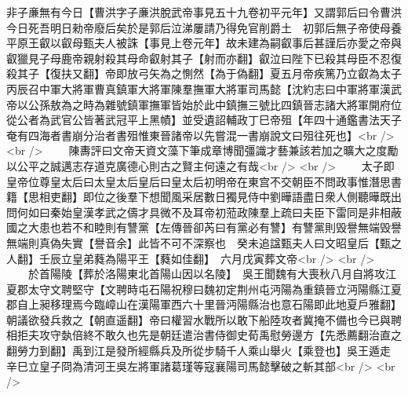 非子亷無有今日【曹洪字子亷洪脫武帝事見五十九卷初平元年】又謂郭后曰令曹洪今日死吾明日勑帝廢后矣於是郭后泣涕屢請乃得免官削爵土　初郭后無子帝使母養平原王叡以叡母甄夫人被誅【事見上卷元年】故未建為嗣叡事后甚謹后亦愛之帝與叡獵見子母鹿帝親射殺其母命叡射其子【射而亦翻】叡泣曰陛下已殺其母臣不忍復殺其子【復扶又翻】帝即放弓矢為之惻然【為于偽翻】夏五月帝疾篤乃立叡為太子丙辰召中軍大將軍曹真鎮軍大將軍陳羣撫軍大將軍司馬懿【沈約志曰中軍將軍漢武帝以公孫敖為之時為雜號鎮軍撫軍皆始於此中鎮撫三號比四鎮晉志諸大將軍開府位從公者為武官公皆著武冠平上黑幘】並受遺詔輔政丁巳帝殂【年四十通鑑書法天子奄有四海者書崩分治者書殂惟東晉諸帝以先嘗混一書崩說文曰殂往死也】<br />
<br />
　　陳夀評曰文帝天資文藻下筆成章博聞彊識才藝兼該若加之曠大之度勵以公平之誠邁志存道克廣德心則古之賢主何遠之有哉<br />
<br />
　　太子即皇帝位尊皇太后曰太皇太后皇后曰皇太后初明帝在東宫不交朝臣不問政事惟潛思書籍【思相吏翻】即位之後羣下想聞風采居數日獨見侍中劉曄語盡日衆人側聽曄既出問何如曰秦始皇漢孝武之儔才具微不及耳帝初蒞政陳羣上疏曰夫臣下雷同是非相蔽國之大患也若不和睦則有讐黨【左傳晉卻芮曰有黨必有讐】有讐黨則毁譽無端毁譽無端則真偽失實【譽音余】此皆不可不深察也　癸未追諡甄夫人曰文昭皇后【甄之人翻】壬辰立皇弟蕤為陽平王【蕤如佳翻】　六月戊寅葬文帝<br />
<br />
　　於首陽陵【葬於洛陽東北首陽山因以名陵】　吳王聞魏有大喪秋八月自將攻江夏郡太守文聘堅守【文聘時屯石陽祝穆曰魏初定荆州屯沔陽為重鎮晉立沔陽縣江夏郡自上昶移理焉今臨嶂山在漢陽軍西六十里晉沔陽縣治也意石陽即此地夏戶雅翻】朝議欲發兵救之【朝直遥翻】帝曰權習水戰所以敢下船陸攻者冀掩不備也今已與聘相拒夫攻守埶倍終不敢久也先是朝廷遣治書侍御史荀禹慰勞邊方【先悉薦翻治直之翻勞力到翻】禹到江是發所經縣兵及所從步騎千人乘山舉火【乘登也】吳王遁走　辛巳立皇子冏為清河王吳左將軍諸葛瑾等寇襄陽司馬懿擊破之斬其部<br />
<br />
